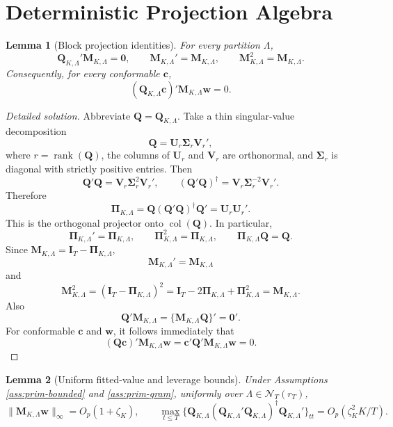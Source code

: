 \documentclass[12pt]{article}
\numberwithin{equation}{section}
\newtheorem{lemma}{Lemma}
\theoremstyle{definition}
\begin{document}
\section{Deterministic Projection Algebra}

\begin{lemma}[Block projection identities]
\label{lem:wb-projection}
For every partition \(\Lambda\),
\[
    \bm Q_{K,\Lambda}'\bm M_{K,\Lambda}=\bm0,
    \qquad
    \bm M_{K,\Lambda}'=\bm M_{K,\Lambda},
    \qquad
    \bm M_{K,\Lambda}^2=\bm M_{K,\Lambda}.
\]
Consequently, for every conformable \(\bm c\),
\[
    (\bm Q_{K,\Lambda}\bm c)'\bm M_{K,\Lambda}\bm w=0.
\]
\end{lemma}


\begin{proof}[Detailed solution]
Abbreviate \(\bm Q=\bm Q_{K,\Lambda}\).  Take a thin singular-value
decomposition
\[
    \bm Q=\bm U_r\bm\Sigma_r\bm V_r',
\]
where \(r=\operatorname{rank}(\bm Q)\), the columns of \(\bm U_r\) and
\(\bm V_r\) are orthonormal, and \(\bm\Sigma_r\) is diagonal with strictly
positive entries.  Then
\[
    \bm Q'\bm Q
    =\bm V_r\bm\Sigma_r^2\bm V_r',
    \qquad
    (\bm Q'\bm Q)^\dagger
    =\bm V_r\bm\Sigma_r^{-2}\bm V_r'.
\]
Therefore
\[
    \bm\Pi_{K,\Lambda}
    =\bm Q(\bm Q'\bm Q)^\dagger\bm Q'
    =\bm U_r\bm U_r'.
\]
This is the orthogonal projector onto \(\operatorname{col}(\bm Q)\).  In
particular,
\[
    \bm\Pi_{K,\Lambda}'=\bm\Pi_{K,\Lambda},
    \qquad
    \bm\Pi_{K,\Lambda}^2=\bm\Pi_{K,\Lambda},
    \qquad
    \bm\Pi_{K,\Lambda}\bm Q=\bm Q.
\]
Since \(\bm M_{K,\Lambda}=\bm I_T-\bm\Pi_{K,\Lambda}\),
\[
    \bm M_{K,\Lambda}'=\bm M_{K,\Lambda}
\]
and
\[
    \bm M_{K,\Lambda}^2
    =(\bm I_T-\bm\Pi_{K,\Lambda})^2
    =\bm I_T-2\bm\Pi_{K,\Lambda}+\bm\Pi_{K,\Lambda}^2
    =\bm M_{K,\Lambda}.
\]
Also
\[
    \bm Q'\bm M_{K,\Lambda}
    =\{\bm M_{K,\Lambda}\bm Q\}'
    =\bm0'.
\]
For conformable \(\bm c\) and \(\bm w\), it follows immediately that
\[
    (\bm Q\bm c)'\bm M_{K,\Lambda}\bm w
    =\bm c'\bm Q'\bm M_{K,\Lambda}\bm w=0.
\]
\end{proof}


\begin{lemma}[Uniform fitted-value and leverage bounds]
\label{lem:wb-leverage}
Under Assumptions \ref{ass:prim-bounded} and \ref{ass:prim-gram}, uniformly over \(\Lambda\in\mathcal N_T(r_T)\),
\[
    \|\bm M_{K,\Lambda}\bm w\|_\infty=O_p(1+\zeta_K),
    \qquad
    \max_{t\leq T}\{\bm Q_{K,\Lambda}(\bm Q_{K,\Lambda}'\bm Q_{K,\Lambda})^\dagger\bm Q_{K,\Lambda}'\}_{tt}
    =
    O_p(\zeta_K^2K/T).
\]
\end{lemma}
\end{document}

